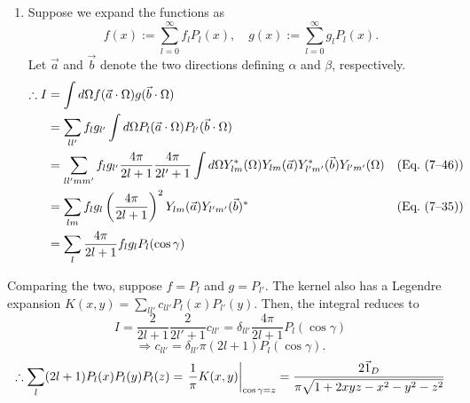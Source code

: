 \begin{enumerate}[wide, labelindent = 0pt, label = (\arabic*)]
\item
Suppose we expand the functions as
\[
    f(x) := \sum_{l=0}^\infty f_l P_l(x),\quad
    g(x) := \sum_{l=0}^\infty g_l P_l(x).
\]
Let $\vec{a}$ and $\vec{b}$ denote the two directions defining $\alpha$ and $\beta$, respectively.
\begin{align*}
    \therefore I
    &= \int d\Omega f(\vec{a}\cdot\Omega) g(\vec{b}\cdot\Omega) \\
    &= \sum_{ll'} f_l g_{l'} \int d\Omega P_l(\vec{a}\cdot\Omega) P_{l'}(\vec{b}\cdot\Omega) \\
    &= \sum_{ll'mm'} f_l g_{l'} \frac{4\pi}{2l+1} \frac{4\pi}{2l'+1}
       \int d\Omega Y_{lm}^*(\Omega) Y_{lm}(\vec{a}) Y_{l'm'}^*(\vec{b}) Y_{l'm'}(\Omega)
           & (\text{Eq.~(7--46)}) \\
    &= \sum_{lm} f_l g_l \left(\frac{4\pi}{2l+1}\right)^2 Y_{lm}(\vec{a}) Y_{l'm'}(\vec{b})^*
           & (\text{Eq.~(7--35)}) \\
    &= \sum_l \frac{4\pi}{2l+1} f_l g_l P_l(\cos\gamma)
\end{align*}
\end{enumerate}

Comparing the two, suppose $f = P_l$ and $g = P_{l'}$.
The kernel also has a Legendre expansion $K(x,y) = \sum_{ll'} c_{ll'} P_l(x) P_{l'}(y)$.
Then, the integral reduces to
\[
    I = \frac{2}{2l+1} \frac{2}{2l'+1} c_{ll'} = \delta_{ll'} \frac{4\pi}{2l+1} P_l(\cos\gamma)
\]
\[
    \Rightarrow c_{ll'} = \delta_{ll'} \pi (2l+1) P_l(\cos\gamma).
\]
\[
    \therefore \sum_l (2l+1) P_l(x) P_l(y) P_l(z)
    = {\left. \frac{1}{\pi} K(x,y) \right|}_{\cos\gamma = z}
    = \frac{2\vec{1}_D}{\pi\sqrt{1 + 2xyz - x^2 - y^2 - z^2}}
\]


